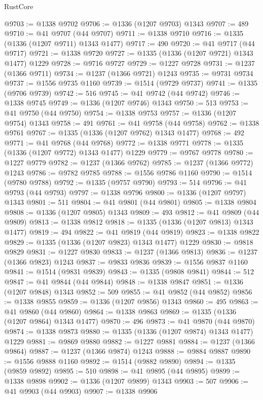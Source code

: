 \begin{lexlean}{RustCore}
\begin{coremodule}
@9703 := @1338 @9702
@9706 := @1336 (@1207 @9703) @1343
@9707 := 489
@9710 := @41 @9707 (@44 @9707)
@9711 := @1338 @9710
@9716 := @1335 (@1336 (@1207 @9711) @1343 @1477)
@9717 := 490
@9720 := @41 @9717 (@44 @9717)
@9721 := @1338 @9720
@9727 := @1335 (@1336 (@1207 @9721) @1343 @1477) @1229
@9728 := @9716 @9727
@9729 := @1227 @9728
@9731 := @1237 (@1366 @9711)
@9734 := @1237 (@1366 @9721) @1243
@9735 := @9731 @9734
@9737 := @1556 @9735 @1160
@9739 := @1514 (@9729 @9737)
@9741 := @1335 (@9706 @9739)
@9742 := 516
@9745 := @41 @9742 (@44 @9742)
@9746 := @1338 @9745
@9749 := @1336 (@1207 @9746) @1343
@9750 := 513
@9753 := @41 @9750 (@44 @9750)
@9754 := @1338 @9753
@9757 := @1336 (@1207 @9754) @1343
@9758 := 491
@9761 := @41 @9758 (@44 @9758)
@9762 := @1338 @9761
@9767 := @1335 (@1336 (@1207 @9762) @1343 @1477)
@9768 := 492
@9771 := @41 @9768 (@44 @9768)
@9772 := @1338 @9771
@9778 := @1335 (@1336 (@1207 @9772) @1343 @1477) @1229
@9779 := @9767 @9778
@9780 := @1227 @9779
@9782 := @1237 (@1366 @9762)
@9785 := @1237 (@1366 @9772) @1243
@9786 := @9782 @9785
@9788 := @1556 @9786 @1160
@9790 := @1514 (@9780 @9788)
@9792 := @1335 (@9757 @9790)
@9793 := 514
@9796 := @41 @9793 (@44 @9793)
@9797 := @1338 @9796
@9800 := @1336 (@1207 @9797) @1343
@9801 := 511
@9804 := @41 @9801 (@44 @9801)
@9805 := @1338 @9804
@9808 := @1336 (@1207 @9805) @1343
@9809 := 493
@9812 := @41 @9809 (@44 @9809)
@9813 := @1338 @9812
@9818 := @1335 (@1336 (@1207 @9813) @1343 @1477)
@9819 := 494
@9822 := @41 @9819 (@44 @9819)
@9823 := @1338 @9822
@9829 := @1335 (@1336 (@1207 @9823) @1343 @1477) @1229
@9830 := @9818 @9829
@9831 := @1227 @9830
@9833 := @1237 (@1366 @9813)
@9836 := @1237 (@1366 @9823) @1243
@9837 := @9833 @9836
@9839 := @1556 @9837 @1160
@9841 := @1514 (@9831 @9839)
@9843 := @1335 (@9808 @9841)
@9844 := 512
@9847 := @41 @9844 (@44 @9844)
@9848 := @1338 @9847
@9851 := @1336 (@1207 @9848) @1343
@9852 := 509
@9855 := @41 @9852 (@44 @9852)
@9856 := @1338 @9855
@9859 := @1336 (@1207 @9856) @1343
@9860 := 495
@9863 := @41 @9860 (@44 @9860)
@9864 := @1338 @9863
@9869 := @1335 (@1336 (@1207 @9864) @1343 @1477)
@9870 := 496
@9873 := @41 @9870 (@44 @9870)
@9874 := @1338 @9873
@9880 := @1335 (@1336 (@1207 @9874) @1343 @1477) @1229
@9881 := @9869 @9880
@9882 := @1227 @9881
@9884 := @1237 (@1366 @9864)
@9887 := @1237 (@1366 @9874) @1243
@9888 := @9884 @9887
@9890 := @1556 @9888 @1160
@9892 := @1514 (@9882 @9890)
@9894 := @1335 (@9859 @9892)
@9895 := 510
@9898 := @41 @9895 (@44 @9895)
@9899 := @1338 @9898
@9902 := @1336 (@1207 @9899) @1343
@9903 := 507
@9906 := @41 @9903 (@44 @9903)
@9907 := @1338 @9906

\end{coremodule}
\end{lexlean}

